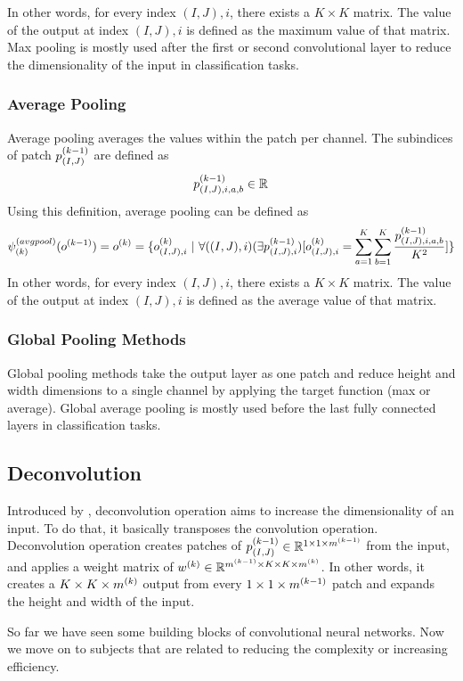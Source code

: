 In other words, for every index $(I,J),i$, there exists a $K \times K$ matrix. The value of the output at index $(I,J),i$ is defined as the maximum value of that matrix. Max pooling is mostly used after the first or second convolutional layer to reduce the dimensionality of the input in classification tasks.

\subsubsection{Average Pooling}
Average pooling averages the values within the patch per channel. The subindices of patch $p^{(k-1)}_{(I,J)}$ are defined as
$$ p^{(k-1)}_{(I,J),i,a,b} \in \mathbb{R}^{} $$
Using this definition, average pooling can be defined as
$$ \psi^{(avgpool)}_{(k)}(o^{(k-1)}) = o^{(k)} = \{o^{(k)}_{(I,J),i}  \ | \ \forall ((I,J),i) (\exists p^{(k-1)}_{(I,J),i}) [o^{(k)}_{(I,J),i} = \sum_{a=1}^{K}\sum_{b=1}^{K}\frac{p^{(k-1)}_{(I,J),i,a,b}}{K^2} ]\} $$
In other words, for every index $(I,J),i$, there exists a $K \times K$ matrix. The value of the output at index $(I,J),i$ is defined as the average value of that matrix. 

\subsubsection{Global Pooling Methods}
Global pooling methods take the output layer as one patch and reduce height and width dimensions to a single channel by applying the target function (max or average). Global average pooling is mostly used before the last fully connected layers in classification tasks.

\subsection{Deconvolution}
Introduced by \cite{zeiler2010deconvolutional}, deconvolution operation aims to increase the dimensionality of an input. To do that, it basically transposes the convolution operation. Deconvolution operation creates patches of $p^{(k-1)}_{(I,J)} \in \mathbb{R}^{1 \times 1 \times m^{(k-1)}}$ from the input, and applies a weight matrix of $w^{(k)} \in \mathbb{R}^{m^{(k-1)} \times K \times K \times m^{(k)}}$. In other words, it creates a $K \times K \times m^{(k)}$ output from every $1 \times 1 \times m^{(k-1)}$ patch and expands the height and width of the input. 

So far we have seen some building blocks of convolutional neural networks. Now we move on to subjects that are related to reducing the complexity or increasing efficiency. 

